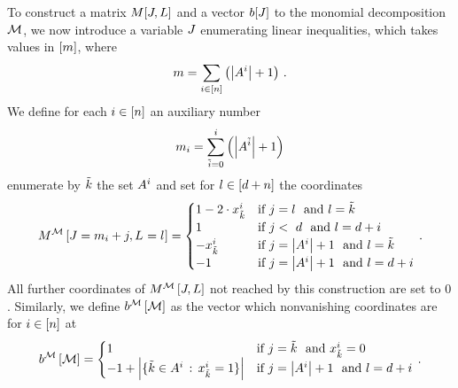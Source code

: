 To construct a matrix $M[J,L]$ and a vector $b[J]$ to the monomial decomposition $\mathcal{M}$, we now introduce a variable $J$ enumerating linear inequalities, which takes values in $[m]$, where
	\[ m =  \sum_{i\in[n]} \left(\left|A^{i}\right| +1\right) \, . \]
We define for each $i\in[n]$ an auxiliary number
	\[ m_{i} = \sum_{\tilde{i}=0}^{i} \left(\left|A^{\tilde{i}}\right| +1\right) \]
enumerate by $\tilde{k}$ the set $A^{i}$ and set for $l\in[d+n]$ the coordinates 
\begin{align}\label{eq:ilpMatrix}
	\matrixofat{\sliceset}{\datvariable=\datanum_{\decindex}+\datindex,\indexedselvariable} =
	\begin{cases}
		1 - 2 \cdot  \catindexof{\seccatenumerator}^{\decindex} & \text{if }  \datindex = \selindex  \text{ and } \selindex = \seccatenumerator   \\ %
		1 & \text{if } \datindex < \catorder  \text{ and } \selindex=\catorder+\decindex \\ %
		-\catindexof{\seccatenumerator}^{\decindex} & \text{if }  \datindex = \cardof{\variablesetof{\decindex}} + 1   \text{ and }  \selindex=\seccatenumerator  \\ %
		-1 & \text{if }  \datindex = \cardof{\variablesetof{\decindex}} + 1  \text{ and }  \selindex = \catorder + \decindex \\ %
	\end{cases} \, . 
\end{align}
All further coordinates of $M^{\mathcal{M}}\left[J,L\right]$ not reached by this construction are set to $0$.
Similarly, we define $b^{\mathcal{M}}\left[\mathcal{M}\right]$ as the vector which nonvanishing coordinates are for $i\in[n]$ at
\begin{align}\label{eq:ilpRhs}
	\rhsofat{\sliceset}{\datvariable=\datanum_{\decindex}+\datindex} =
	\begin{cases}
		1 & \text{if }  \datindex = \seccatenumerator \text{ and } \catindexof{\seccatenumerator}^{\decindex} = 0 \\ %
		-1 + \cardof{\{\seccatenumerator\in\variablesetof{\decindex} \, : \,  \catindexof{\seccatenumerator}^{\decindex} = 1\}}  & \text{if }  \datindex = \cardof{\variablesetof{\decindex}} + 1  \text{ and }  \selindex = \catorder + \decindex \\ %
	\end{cases} \, . 
\end{align}


